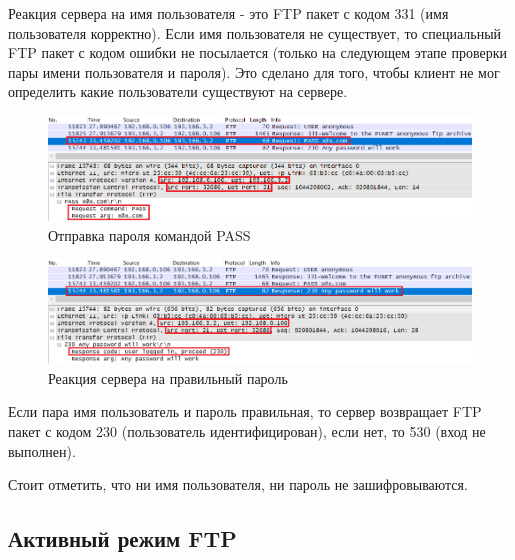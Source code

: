 \documentclass[14pt,a4paper,report]{report}
\begin{document}
Реакция сервера на имя пользователя - это FTP пакет с кодом 331 (имя пользователя корректно). Если имя пользователя не существует, то специальный FTP пакет с кодом ошибки не посылается (только на следующем этапе проверки пары имени пользователя и пароля). Это сделано для того, чтобы клиент не мог определить какие пользователи существуют на сервере.

\clearpage

\begin{figure}[h!]
	\centering
	\includegraphics[scale = 0.63]{images/ftp4.png}
	
	\caption{Отправка пароля командой PASS}
	\label{image:6}
\end{figure}

\begin{figure}[h!]
	\centering
	\includegraphics[scale = 0.66]{images/ftp5.png}
	
	\caption{Реакция сервера на правильный пароль}
	\label{image:7}
\end{figure}

Если пара имя пользователь и пароль правильная, то сервер возвращает FTP пакет с кодом 230 (пользователь идентифицирован), если нет, то 530 (вход не выполнен).

Стоит отметить, что ни имя пользователя, ни пароль не зашифровываются.

\subsection{Активный режим FTP}
\end{document}
